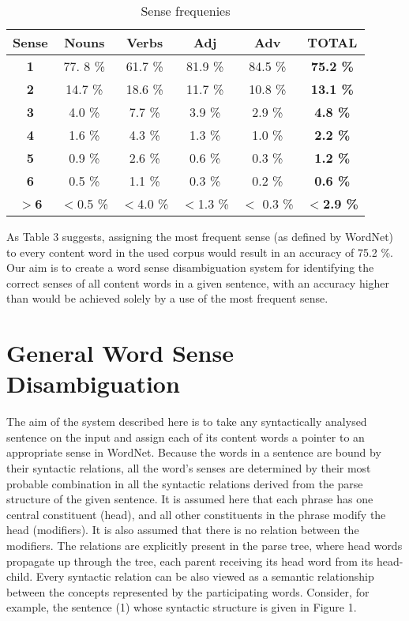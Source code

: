 \begin{table}[t]
  \leavevmode
    \caption{Sense frequenies}
    \label{tab:3}
  \begin{center}
\begin{tabular}[c]{|c|c|c|c|c|c|}\hline
{\bf Sense} & Nouns & Verbs & Adj & Adv & {\bf TOTAL} \\\hline
{\bf  1} & 77. 8 \% & 61.7 \% & 81.9 \% & 84.5 \% & {\bf 75.2 \%} \\\hline
{\bf 2} & 14.7 \% & 18.6 \% & 11.7 \% & 10.8 \% & {\bf 13.1 \%} \\\hline
{\bf  3} & 4.0 \% & 7.7 \% & 3.9 \% & 2.9 \% & {\bf 4.8 \%} \\\hline
{\bf 4} & 1.6 \% & 4.3 \% & 1.3 \% & 1.0 \% & {\bf 2.2 \%} \\\hline
{\bf  5} & 0.9 \% & 2.6 \% & 0.6 \% & 0.3 \% & {\bf 1.2 \%} \\\hline
{\bf 6} & 0.5 \% & 1.1 \% & 0.3 \% & 0.2 \% & {\bf 0.6 \%} \\\hline
{\bf  $>$6} & $<$0.5 \% & $<$4.0 \% & $<$1.3 \% & $<$ 0.3 \% & {\bf $<$2.9 \%}\\\hline
\end{tabular}
\end{center}
\end{table}

As Table 3 suggests, assigning the most frequent sense (as defined by WordNet) to every content word in the used corpus would result in an accuracy of 75.2 \%. Our aim is to create a word sense disambiguation system for identifying the correct senses of all content words in a given sentence, with an accuracy higher than would be achieved solely by a use of the most frequent sense.

\section{General Word Sense Disambiguation}

The aim of the system described here is to take any syntactically analysed sentence on the input and assign each of its content words a pointer to an appropriate sense in WordNet. Because the words in a sentence are bound by their syntactic relations, all the word's senses are determined by their most probable combination in all the syntactic relations derived from the parse structure of the given sentence. It is assumed here that each phrase has one central constituent (head), and all other constituents in the phrase modify the head (modifiers). It is also assumed that there is no relation between the modifiers. The relations are explicitly present in the parse tree, where head words propagate up through the tree, each parent receiving its head word from its head-child. Every syntactic relation can be also viewed as a semantic relationship between the concepts represented by the participating words. Consider, for example, the sentence (1) whose syntactic structure is given in Figure 1.

